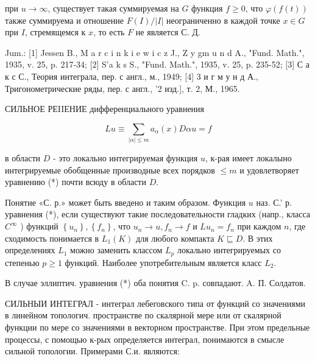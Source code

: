 \documentclass[10pt]{article}
\begin{document}
при $u \rightarrow \infty$, существует такая суммируемая на $G$ функция $f \geqslant 0$, что $\varphi(f(t))$ также суммируема и отношение $F(I) /|I|$ неограниченно в каждой точке $x \in G$ при $I$, стремящемся к $x$, то есть $F$ не является С. Д.



Jum.: [1] Jessen B., M a r c i n k i e w i c z J., $\mathrm{Z}$ y gm u n d A., "Fund. Math.", 1935, v. 25, p. 217-34; [2] S'a k s S., "Fund. Math.", 1935, v. 25, p. 235-52; [3] С а к с С., Теория интеграла, пер. с англ., м., 1949; [4] 3 и г м у н д А., Тригонометрические ряды, пер. с англ., '2 изд.], т. 2, М., 1965.



СИЛЬНОЕ РЕIIЕНИЕ дифференциального уравнения



\[

L u \equiv \sum_{|\alpha| \leqslant m} a_{\alpha}(x) D \alpha u=f

\]



в области $D$ - это локально интегрируемая функция $u$, к-рая имеет локалыно интегрируемые обобщенные производные всех порядков $\leqslant m$ и удовлетворяет уравнению (*) почти всюду в области $D$.



Понятие «С. р.» может быть введено и таким образом. Функция $u$ наз. С.' р. уравнения (*), если существуют такие последовательности гладких (напр., класса $C^{\infty}$ ) функций $\left\{u_{n}\right\},\left\{f_{n}\right\}$, что $u_{n} \rightarrow u, f_{n} \rightarrow f$ и $L u_{n}=f_{n}$ при каждом $n$, где сходимость понимается в $L_{1}(K)$ для любого компакта $K \sqsubseteq D$. В этих определениях $L_{1}$ можно заменить классом $L_{p}$ локально интегрируемых со степенью $p \geqslant 1$ функций. Наиболее употребительным является класс $L_{2}$.



В случае эллиптич. уравнения (*) оба понятия C. p. совпадают. A. П. Солдатов.



СИЛЬНЫИ ИНТЕГРАЛ - интеграл лебеговского типа от функций со значениями в линейном топологич. пространстве по скалярной мере или от скалярной функции по мере со значениями в векторном пространстве. При этом предельные процессы, с помощью к-рых определяется интеграл, понимаются в смысле сильной топологии. Примерами С.и. являются:
\end{document}
